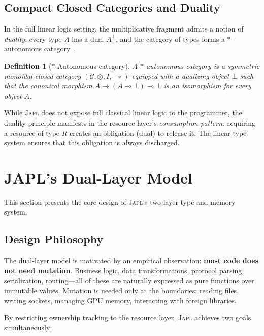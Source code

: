 \documentclass[11pt]{article}
\newtheorem{definition}[theorem]{Definition}
\newcommand{\JAPL}{\textsc{Japl}}
\newcommand{\lolli}{\multimap}
\newcommand{\tensor}{\otimes}
\begin{document}
\subsection{Compact Closed Categories and Duality}\label{sec:compact-closed}

In the full linear logic setting, the multiplicative fragment admits
a notion of \emph{duality}: every type $A$ has a dual $A^\perp$,
and the category of types forms a $\ast$-autonomous
category~\cite{barr1991autonomous}.

\begin{definition}[$\ast$-Autonomous category]\label{def:star-auto}
A $\ast$-\emph{autonomous category} is a symmetric monoidal closed
category $(\mathcal{C}, \tensor, I, \lolli)$ equipped with a
dualizing object $\bot$ such that the canonical morphism
$A \to (A \lolli \bot) \lolli \bot$ is an isomorphism for every
object $A$.
\end{definition}

While \JAPL{} does not expose full classical linear logic to the
programmer, the duality principle manifests in the resource layer's
\emph{consumption pattern}: acquiring a resource of type $R$ creates
an obligation (dual) to release it.  The linear type system ensures
that this obligation is always discharged.


\section{JAPL's Dual-Layer Model}\label{sec:dual-layer}

This section presents the core design of \JAPL{}'s two-layer type and
memory system.

\subsection{Design Philosophy}

The dual-layer model is motivated by an empirical observation:
\textbf{most code does not need mutation}.  Business logic, data
transformations, protocol parsing, serialization, routing---all of
these are naturally expressed as pure functions over immutable values.
Mutation is needed only at the boundaries: reading files, writing
sockets, managing GPU memory, interacting with foreign libraries.

By restricting ownership tracking to the resource layer, \JAPL{}
achieves two goals simultaneously:
\end{document}
